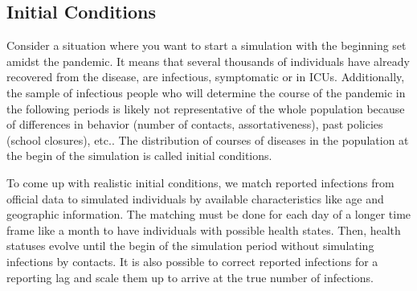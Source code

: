 \subsection{Initial Conditions} %
\label{sub:initial_conditions}

Consider a situation where you want to start a simulation with the beginning set amidst the pandemic. It means that several thousands of individuals have already recovered from the disease, are infectious, symptomatic or in ICUs. Additionally, the sample of infectious people who will determine the course of the pandemic in the following periods is likely not representative of the whole population because of differences in behavior (number of contacts, assortativeness), past policies (school closures), etc.. The distribution of courses of diseases in the population at the begin of the simulation is called initial conditions.

To come up with realistic initial conditions, we match reported infections from official data to simulated individuals by available characteristics like age and geographic information. The matching must be done for each day of a longer time frame like a month to have individuals with possible health states. Then, health statuses evolve until the begin of the simulation period without simulating infections by contacts. It is also possible to correct reported infections for a reporting lag and scale them up to arrive at the true number of infections.

